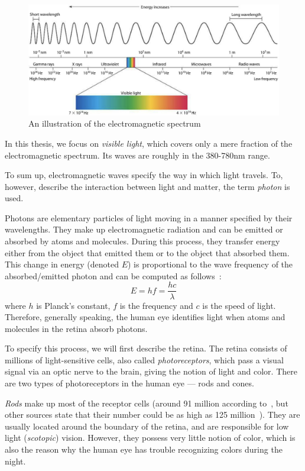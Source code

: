 \begin{figure}[t]
	\centering
	\includegraphics[width=0.8\linewidth]{img/electromagnetic_spectrum.png}
	\caption{An illustration of the electromagnetic spectrum~\cite{electromagneticSpectrum}} \label{fig:electromagneticSpectrum}
\end{figure}

In this thesis, we focus on \emph{visible light}, which covers only a mere fraction of the electromagnetic spectrum. Its waves are roughly in the 380-780nm range.

To sum up, electromagnetic waves specify the way in which light travels. To, however, describe the interaction between light and matter, the term \emph{photon} is used.

Photons are elementary particles of light moving in a manner specified by their wavelengths. They make up electromagnetic radiation and can be emitted or absorbed by atoms and molecules. During this process, they transfer energy either from the object that emitted them or to the object that absorbed them. This change in energy (denoted $E$) is proportional to the wave frequency of the absorbed/emitted photon and can be computed as follows~\citep{planckConstant}: 
\begin{equation} \label{energyEquation}
E = hf = \dfrac{hc}{\lambda}
\end{equation}
where $h$ is Planck's constant, $f$ is the frequency and $c$ is the speed of light. Therefore, generally speaking, the human eye identifies light when atoms and molecules in the retina absorb photons. 

To specify this process, we will first describe the retina. The retina consists of millions of light-sensitive cells, also called \emph{photoreceptors}, which pass a visual signal via an optic nerve to the brain, giving the notion of light and color. There are two types of photoreceptors in the human eye --- rods and cones.

\emph{Rods} make up most of the receptor cells (around 91 million according to~\citet{rods91cones4f5}, but other sources state that their number could be as high as 125 million~\cite{rods125cones6}). They are usually located around the boundary of the retina, and are responsible for low light (\emph{scotopic}) vision. However, they possess very little notion of color, which is also the reason why the human eye has trouble recognizing colors during the night.

